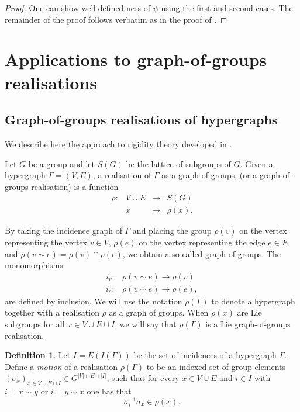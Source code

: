 \documentclass{article}
\theoremstyle{definition}
\newtheorem{definition}[theorem]{Definition}
\theoremstyle{remark}
\begin{document}
\begin{proof}
One can show well-defined-ness of $\psi$ using the first and second cases. The remainder of the proof follows verbatim as in the proof of .
\end{proof}


\section{Applications to graph-of-groups realisations}\label{sec: applications to gogs}
\subsection{Graph-of-groups realisations of hypergraphs}\label{subsec: Background - graphs of groups}
We describe here the approach to rigidity theory developed in \cite{graphsofgroups}.

Let $G$ be a group and let $S(G)$ be the lattice of subgroups of $G$.
Given a hypergraph $\Gamma = (V,E)$, a realisation of $\Gamma$ as a graph of groups, (or a graph-of-groups realisation) is a function
\begin{equation*}
    \begin{array}{rccl}
    \rho:& V\cup E &\rightarrow &S(G)\\ 
    &x&\mapsto &\rho(x).
    \end{array}
\end{equation*}


By taking the incidence graph of $\Gamma$ and placing the group $\rho(v)$ on the vertex representing the vertex $v\in V$, $\rho(e)$ on the vertex representing the edge $e\in E$, and $\rho(v \sim e)=\rho(v)\cap \rho(e)$, we obtain a so-called graph of groups. The monomorphisms 
\begin{align*}
    i_v:&\rho(v \sim e) \rightarrow \rho(v)\\
    i_e:&\rho(v \sim e) \rightarrow \rho(e),
\end{align*}
are defined by inclusion. We will use the notation $\rho(\Gamma)$ to denote a hypergraph together with a realisation $\rho$ as a graph of groups. When $\rho(x)$ are Lie subgroups for all $x\in V\cup E\cup I$, we will say that $\rho(\Gamma)$ is a Lie graph-of-groups realisation.

\begin{definition}
\label{def:motion}
Let $I = E(I(\Gamma))$ be the set of incidences of a hypergraph $\Gamma$. Define a {\em motion} of a realisation $\rho(\Gamma)$ to be an indexed set of group elements $(\sigma_x)_{x\in V\cup E \cup I} \in G^{\vert V\vert + \vert E\vert +\vert I \vert}$, such that for every $x\in V\cup E$ and $i\in I$ with $i=x\sim y$ or $i=y \sim x$ one has that 
\begin{equation}
\label{eq:incidencepreserving}
    \sigma_i^{-1}\sigma_x\in \rho(x).
\end{equation}
\end{definition}
        
\end{document}
